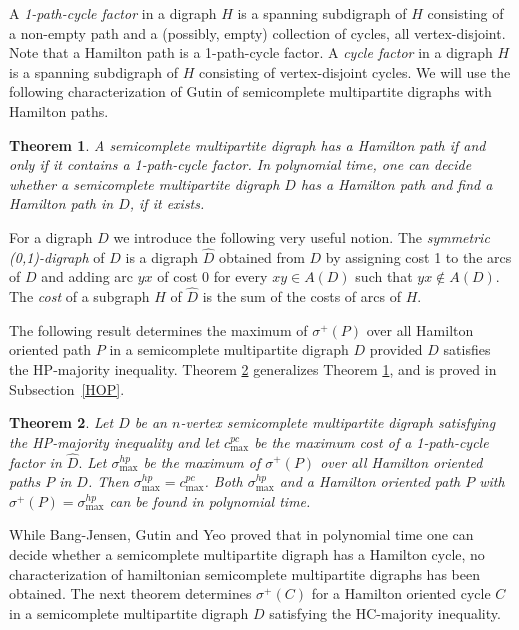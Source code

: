 \documentclass{article}
\newtheorem{theorem}{Theorem}[section]
\newcommand{\QGn}[1]{{#1}}
\newcommand{\GGnn}[1]{{#1}}
\newcommand{\2}{\vspace{0.2cm}}
\begin{document}
A {\em 1-path-cycle factor} in a digraph $H$ is  a spanning subdigraph of $H$ consisting of a \GGnn{non-empty} path and a \GGnn{(possibly, empty)} collection of cycles, all vertex-disjoint. Note that a Hamilton path
is a 1-path-cycle factor. \QGn{A {\em cycle factor} in a digraph $H$ is a spanning subdigraph of $H$ consisting of vertex-disjoint cycles.} We will use the following characterization of Gutin \cite{G88,G93} of semicomplete multipartite digraphs with Hamilton paths.

\begin{theorem}\label{mthp}
A semicomplete multipartite digraph  has a Hamilton path if and only if it contains a 1-path-cycle factor.  In polynomial time, one can decide whether a semicomplete multipartite digraph $D$ has a Hamilton path and find a Hamilton path in $D$, if it exists.
\end{theorem}
	
\GGnn{For a digraph $D$ we introduce the following very useful  notion.} The {\em symmetric (0,1)-digraph} of $D$ is a digraph $\hat{D}$ obtained from $D$ by assigning cost 1 to the arcs of $D$ and adding arc $yx$ of cost 0 for every $xy\in A(D)$
such that $yx\not\in A(D)$. The {\em cost}  of a subgraph $H$ of $\hat{D}$ is the sum of the costs of arcs of $H.$

The following result determines the maximum of \GGnn{$\sigma^+(P)$} over all Hamilton oriented path $P$ in a semicomplete multipartite digraph $D$ provided $D$ satisfies the HP-majority inequality.
Theorem \ref{mthop} generalizes Theorem \ref{mthp}, and is proved in Subsection~\ref{HOP}.

\begin{theorem}\label{mthop}
Let $D$ be an $n$-vertex semicomplete multipartite digraph satisfying the HP-majority inequality and let $c^{pc}_{\max}$ be the maximum cost of a 1-path-cycle factor in $\hat{D}.$
Let $\sigma^{hp}_{\max}$ be \GGnn{the maximum of $\sigma^+(P)$ over all Hamilton oriented paths $P$ in $D$.}
Then $\sigma^{hp}_{\max}=c^{pc}_{\max}$. Both $\sigma^{hp}_{\max}$ and a Hamilton oriented path $P$ with  $\sigma^+(P)=\sigma^{hp}_{\max}$
can be found in polynomial time.
\end{theorem}

While Bang-Jensen, Gutin and Yeo \cite{BGY98} proved that in polynomial time one can decide whether a semicomplete multipartite digraph has a Hamilton cycle, no characterization of hamiltonian semicomplete multipartite digraphs has been obtained. The next theorem determines $\sigma^+(C)$ for a Hamilton oriented cycle $C$ in a semicomplete multipartite digraph $D$ satisfying the HC-majority inequality.
\end{document}
